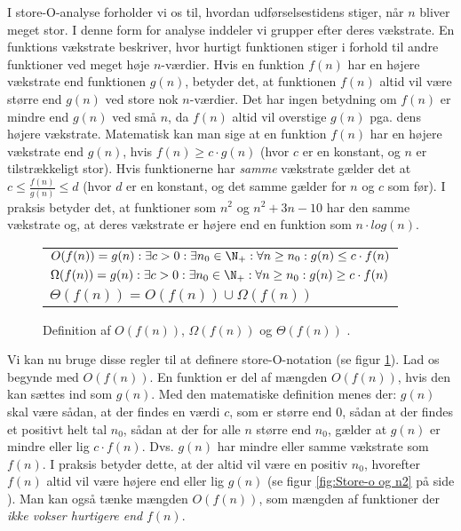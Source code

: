 I store-O-analyse forholder vi os til, hvordan udførselsestidens stiger, når $n$ bliver meget stor. I denne form for analyse inddeler vi grupper efter deres vækstrate. En funktions vækstrate beskriver, hvor hurtigt funktionen stiger i forhold til andre funktioner ved meget høje $n$-værdier. Hvis en funktion $f(n)$ har en højere vækstrate end funktionen $g(n)$, betyder det, at funktionen $f(n)$ altid vil være større end $g(n)$ ved store nok $n$-værdier. Det har ingen betydning om $f(n)$ er mindre end $g(n)$ ved små $n$, da $f(n)$ altid vil overstige $g(n)$ pga. dens højere vækstrate. Matematisk kan man sige at en funktion $f(n)$ har en højere vækstrate end $g(n)$, hvis $f(n) \geq c \cdot g(n)$  (hvor $c$ er en konstant, og $n$ er tilstrækkeligt stor). Hvis funktionerne har \emph{samme} vækstrate gælder det at $c \leq \frac{f(n)}{g(n)} \leq d$ (hvor $d$ er en konstant, og det samme gælder for $n$ og $c$ som før). I praksis betyder det, at funktioner som $n^2$ og $n^2+3n-10$ har den samme vækstrate og, at deres vækstrate er højere end en funktion som $n \cdot log(n)$.\\

\begin{figure}[h]
	\begin{center}
		\padtable
		\begin{tabular}{l}
			\hline
			$O(f(n)) = {g(n): \exists c > 0: \exists n_0 \in \N_+: \forall n \geq n_0: g(n) \leq c \cdot f(n)}$\\
			$\Omega (f(n)) = {g(n): \exists c > 0: \exists n_0 \in \N_+: \forall n \geq n_0: g(n) \geq c \cdot f(n)}$\\
			$\Theta (f(n)) = O(f(n)) \cup \Omega (f(n))$\\
			\hline
		\end{tabular}
	\end{center}
	\caption{Definition af $O(f(n))$, $\Omega (f(n))$ og $\Theta (f(n))$ \cite[s. 26]{aogd}.}
	\label{fig:Store-O definition}
\end{figure}

Vi kan nu bruge disse regler til at definere store-O-notation (se figur \ref{fig:Store-O definition}). Lad os begynde med $O(f(n))$. En funktion er del af mængden $O(f(n))$, hvis den kan sættes ind som $g(n)$. Med den matematiske definition menes der: $g(n)$ skal være sådan, at der findes en værdi $c$, som er større end $0$, sådan at der findes et positivt helt tal $n_0$, sådan at der for alle $n$ større end $n_0$, gælder at $g(n)$ er mindre eller lig $c \cdot f(n)$. Dvs. $g(n)$ har mindre eller samme vækstrate som $f(n)$. I praksis betyder dette, at der altid vil være en positiv $n_0$, hvorefter $f(n)$ altid vil være højere end eller lig $g(n)$ (se figur \ref{fig:Store-o og n2} på side \pageref{fig:Store-o og n2}). Man kan også tænke mængden $O(f(n))$, som mængden af funktioner der \emph{ikke vokser hurtigere end} $f(n)$.\\

